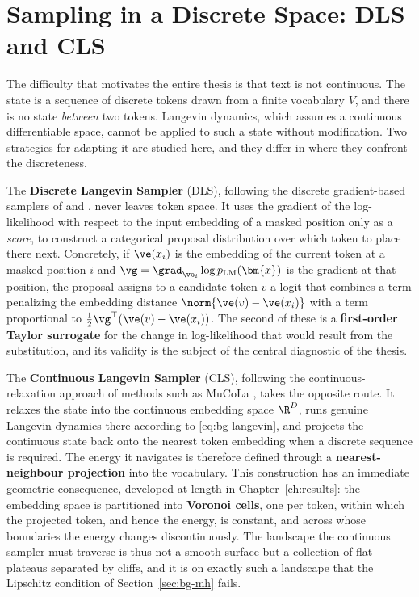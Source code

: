 \section{Sampling in a Discrete Space: DLS and CLS}
\label{sec:bg-samplers}

The difficulty that motivates the entire thesis is that text is not continuous. The state is a sequence of discrete tokens drawn from a finite vocabulary $V$, and there is no state \emph{between} two tokens. Langevin dynamics, which assumes a continuous differentiable space, cannot be applied to such a state without modification. Two strategies for adapting it are studied here, and they differ in where they confront the discreteness.

The \textbf{Discrete Langevin Sampler} (DLS), following the discrete gradient-based samplers of \citet{grathwohl2021oops} and \citet{zhang2022langevin}, never leaves token space. It uses the gradient of the log-likelihood with respect to the input embedding of a masked position only as a \emph{score}, to construct a categorical proposal distribution over which token to place there next. Concretely, if $\ve(x_i)$ is the embedding of the current token at a masked position $i$ and $\vg = \grad_{\ve_i}\log p_{\text{LM}}(\bm{x})$ is the gradient at that position, the proposal assigns to a candidate token $v$ a logit that combines a term penalizing the embedding distance $\norm{\ve(v) - \ve(x_i)}$ with a term proportional to $\tfrac{1}{2}\vg^\top(\ve(v) - \ve(x_i))$. The second of these is a \textbf{first-order Taylor surrogate} for the change in log-likelihood that would result from the substitution, and its validity is the subject of the central diagnostic of the thesis.

The \textbf{Continuous Langevin Sampler} (CLS), following the continuous-relaxation approach of methods such as MuCoLa \citep{kumar2022gradient}, takes the opposite route. It relaxes the state into the continuous embedding space $\R^D$, runs genuine Langevin dynamics there according to \eqref{eq:bg-langevin}, and projects the continuous state back onto the nearest token embedding when a discrete sequence is required. The energy it navigates is therefore defined through a \textbf{nearest-neighbour projection} into the vocabulary. This construction has an immediate geometric consequence, developed at length in Chapter~\ref{ch:results}: the embedding space is partitioned into \textbf{Voronoi cells}, one per token, within which the projected token, and hence the energy, is constant, and across whose boundaries the energy changes discontinuously. The landscape the continuous sampler must traverse is thus not a smooth surface but a collection of flat plateaus separated by cliffs, and it is on exactly such a landscape that the Lipschitz condition of Section~\ref{sec:bg-mh} fails.

